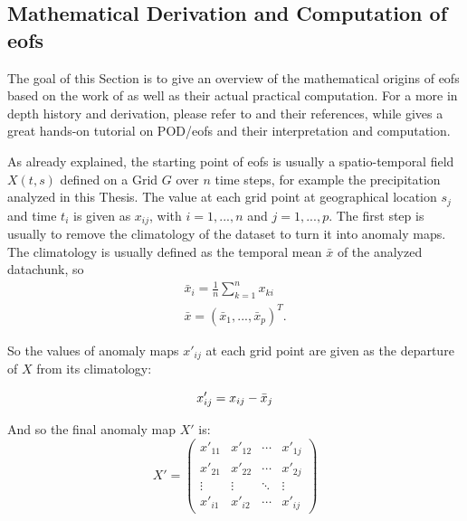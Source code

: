 \subsection{Mathematical Derivation and Computation of \acp{eof}}

The goal of this Section is to give an overview of the mathematical origins of \acp{eof} based on the work of  as well as their actual practical computation. 
For a more in depth history and derivation, please refer to \cite{hannachi_empirical_2007} and their references, while  gives a great hands-on tutorial on POD/\acp{eof} and their interpretation and computation. 

As already explained, the starting point of \acp{eof} is usually a spatio-temporal field $X(t, s)$ defined on a Grid $G$ over $n$ time steps, for example the precipitation analyzed in this Thesis. 
The value at each grid point at geographical location $s_j$ and time $t_i$ is given as $x_{ij}$, with $i = 1, ..., n$  and $j = 1, ..., p$.  
The first step is usually to remove the climatology of the dataset to turn it into anomaly maps. 
The climatology is usually defined as the temporal mean $\bar{x}$ of the analyzed datachunk, so 
\begin{align}
  \bar{x}_i = \frac{1}{n} \sum^{n}_{k=1} x_{ki} \\
  \bar{x} = (\bar{x}_1, ..., \bar{x}_p)^T .
  \label{eq:climatology}
\end{align}

So the values of anomaly maps $x'_{ij}$ at each grid point are given as the departure of $X$ from its climatology: 



\begin{equation}
  x'_{ij} = x_{ij} - \bar{x}_j \\
  \label{eq:anomaly map elements}
\end{equation}

And so the final anomaly map $X'$ is: 
\begin{equation}
  X' = \begin{pmatrix}
x'_{11} & x'_{12} & \cdots & x'_{1j} \\
x'_{21} & x'_{22} & \cdots & x'_{2j} \\
\vdots & \vdots & \ddots & \vdots \\
x'_{i1} & x'_{i2} & \cdots & x'_{ij}
\end{pmatrix}
  \label{eq:anomaly map}
\end{equation}

